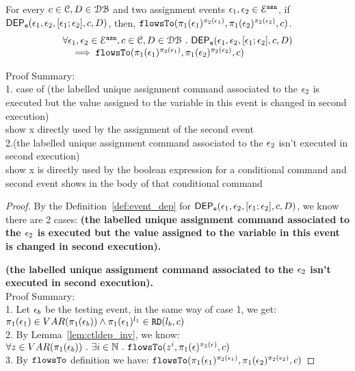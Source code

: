 \begin{lem}
	\label{lem:flowsto_soundness_emptytrace}
	For every $ c \in \mathcal{C}, D \in \mathcal{DB}$ and two assignment events $\mathtt{\epsilon}_1, \mathtt{\epsilon}_2 \in \mathcal{E}^{\mathtt{{asn}}}$,
	if $\mathsf{DEP_{\mathtt{e}}}(\mathtt{\epsilon}_1, \mathtt{\epsilon}_2, [\mathtt{\epsilon}_1; \mathtt{\epsilon}_2],  c, D) $,
	then, $\mathtt{flowsTo}(\pi_1(\mathtt{\epsilon}_1)^{\pi_2(\mathtt{\epsilon}_1)}, \pi_1(\mathtt{\epsilon}_2)^{\pi_2(\mathtt{\epsilon}_2)}, c)$.
	\[
	\begin{array}{l}
		\forall \mathtt{\epsilon}_1, \mathtt{\epsilon}_2 \in \mathcal{E}^{\mathtt{{asn}}}, c \in \mathcal{C}, D \in \mathcal{DB} 
		~.~ 
		\mathsf{DEP_{\mathtt{e}}}(\mathtt{\epsilon}_1, \mathtt{\epsilon}_2, [\mathtt{\epsilon}_1; \mathtt{\epsilon}_2],  c, D) 
		\\ \quad 
		\implies 
		\mathtt{flowsTo}(\pi_1(\mathtt{\epsilon}_1)^{\pi_2(\mathtt{\epsilon}_1)}, \pi_1(\mathtt{\epsilon}_2)^{\pi_2(\mathtt{\epsilon}_2)}, c)
	\end{array}
	\]
\end{lem}
Proof Summary:
\\
1. case of (the labelled unique assignment command associated to the $\mathtt{\epsilon}_2$ 
is executed but the value assigned to the variable in this event is changed in second execution)
\\
show x directly used by the assignment of the second event
\\
2.(the labelled unique assignment command associated to the $\mathtt{\epsilon}_2$ isn't executed in second execution)
\\
show x is directly used by the boolean expression for a conditional command and second event shows in the body of that conditional command 
%
\begin{proof}
	By the Definition~\ref{def:event_dep} for $\mathsf{DEP_{\mathtt{e}}}(\mathtt{\epsilon}_1, \mathtt{\epsilon}_2, [\mathtt{\epsilon}_1; \mathtt{\epsilon}_2], c, D)$, 
	we know there are 2 cases:
		\textbf{(the labelled unique assignment command associated to the $\mathtt{\epsilon}_2$ 
		is executed but the value assigned to the variable in this event is changed in second execution).}

		\textbf{(the labelled unique assignment command associated to the $\mathtt{\epsilon}_2$ isn't executed in second execution).}
		\\
		Proof Summary:
		\\
		1. Let $\mathtt{\epsilon}_b$ be the testing event,
		in the same way of case 1, we get:
		 $\pi_1(\mathtt{\epsilon}_1) \in VAR(\pi_1(\mathtt{\epsilon}_b)) 
		 \land 
		\pi_1(\mathtt{\epsilon}_1)^{l_1} \in \mathtt{RD}(l_b, c)$
		 \\
		 2. By Lemma~\ref{lem:ctldep_inv}, we know:
		   $\forall z \in VAR(\pi_1(\mathtt{\epsilon}_b)) ~.~ \exists i \in \mathbb{N} ~.~
		 \mathtt{flowsTo}(z^i, \pi_1(\mathtt{\epsilon})^{\pi_2(\mathtt{\epsilon})}, c)$
		 \\
		 3. By $\mathtt{flowsTo}$ definition we have:
		   $\mathtt{flowsTo}(\pi_1(\mathtt{\epsilon}_1)^{\pi_2(\mathtt{\epsilon}_1)}, \pi_1(\mathtt{\epsilon}_2)^{\pi_2(\mathtt{\epsilon}_2)}, c)$
		
\end{proof}
